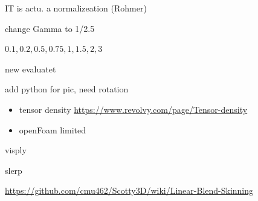 \documentclass{beamer}
\begin{document}
\begin{frame}
IT is actu. a normalizeation (Rohmer)

change Gamma to 1/2.5

$0.1, 0.2, 0.5, 0.75,1, 1.5, 2, 3$ 
\end{frame}

\begin{frame}
new evaluatet

add python for pic, need rotation 

\begin{itemize}
\item tensor density
\url{https://www.revolvy.com/page/Tensor-density}
\item openFoam limited
\end{itemize}
\end{frame}
\begin{frame}
visply

slerp

\url{https://github.com/cmu462/Scotty3D/wiki/Linear-Blend-Skinning}
\end{frame}
\end{document}
